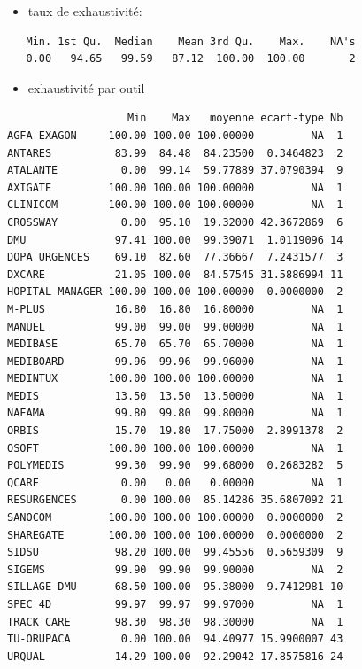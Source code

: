 \documentclass[]{article}
\providecommand{\tightlist}{%
  \setlength{\itemsep}{0pt}\setlength{\parskip}{0pt}}
\begin{document}
\begin{itemize}
\tightlist
\item
  taux de exhaustivité:
\end{itemize}

\begin{verbatim}
   Min. 1st Qu.  Median    Mean 3rd Qu.    Max.    NA's 
   0.00   94.65   99.59   87.12  100.00  100.00       2 
\end{verbatim}

\begin{itemize}
\tightlist
\item
  exhaustivité par outil
\end{itemize}

\begin{verbatim}
                   Min    Max   moyenne ecart-type Nb
AGFA EXAGON     100.00 100.00 100.00000         NA  1
ANTARES          83.99  84.48  84.23500  0.3464823  2
ATALANTE          0.00  99.14  59.77889 37.0790394  9
AXIGATE         100.00 100.00 100.00000         NA  1
CLINICOM        100.00 100.00 100.00000         NA  1
CROSSWAY          0.00  95.10  19.32000 42.3672869  6
DMU              97.41 100.00  99.39071  1.0119096 14
DOPA URGENCES    69.10  82.60  77.36667  7.2431577  3
DXCARE           21.05 100.00  84.57545 31.5886994 11
HOPITAL MANAGER 100.00 100.00 100.00000  0.0000000  2
M-PLUS           16.80  16.80  16.80000         NA  1
MANUEL           99.00  99.00  99.00000         NA  1
MEDIBASE         65.70  65.70  65.70000         NA  1
MEDIBOARD        99.96  99.96  99.96000         NA  1
MEDINTUX        100.00 100.00 100.00000         NA  1
MEDIS            13.50  13.50  13.50000         NA  1
NAFAMA           99.80  99.80  99.80000         NA  1
ORBIS            15.70  19.80  17.75000  2.8991378  2
OSOFT           100.00 100.00 100.00000         NA  1
POLYMEDIS        99.30  99.90  99.68000  0.2683282  5
QCARE             0.00   0.00   0.00000         NA  1
RESURGENCES       0.00 100.00  85.14286 35.6807092 21
SANOCOM         100.00 100.00 100.00000  0.0000000  2
SHAREGATE       100.00 100.00 100.00000  0.0000000  2
SIDSU            98.20 100.00  99.45556  0.5659309  9
SIGEMS           99.90  99.90  99.90000         NA  2
SILLAGE DMU      68.50 100.00  95.38000  9.7412981 10
SPEC 4D          99.97  99.97  99.97000         NA  1
TRACK CARE       98.30  98.30  98.30000         NA  1
TU-ORUPACA        0.00 100.00  94.40977 15.9900007 43
URQUAL           14.29 100.00  92.29042 17.8575816 24
\end{verbatim}
\end{document}
